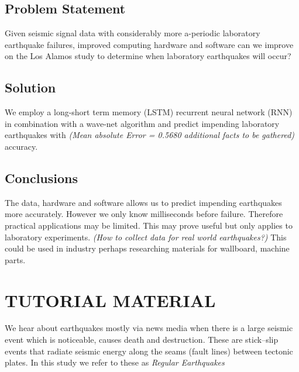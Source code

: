 \documentclass[]{llncs}
\begin{document}
\subsection{Problem Statement}
Given seismic signal data with considerably more a-periodic laboratory earthquake failures,  improved computing hardware and software can we improve on the Los Alamos study\cite{Bertrand} to determine when laboratory earthquakes will occur?\par


\subsection{Solution}
We employ a long-short term memory (LSTM) recurrent neural network (RNN) in combination with a wave-net algorithm and predict impending laboratory earthquakes with {\em (Mean absolute Error = 0.5680 additional facts to be gathered)} accuracy.
\subsection{Conclusions}
The data, hardware and software allows us to predict impending earthquakes more accurately. However we only know milliseconds before failure. Therefore practical applications may be limited. This may prove useful but only applies to laboratory experiments. {\em (How to collect data for real world earthquakes?)}  This could be used in industry perhaps researching materials for wallboard, machine parts.\par


\section{TUTORIAL MATERIAL}
We hear about earthquakes mostly via news media when there is a large seismic event which is noticeable, causes death and destruction. These are stick–slip events that radiate seismic energy along the seams (fault lines) between tectonic plates. In this study we refer to these as {\em Regular Earthquakes} \par
\end{document}
